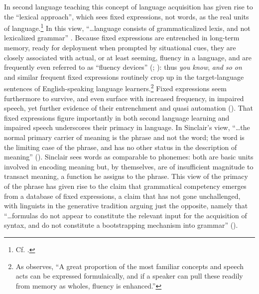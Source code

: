 \documentclass[output=paper]{langsci/langscibook}
\begin{document}
In second language teaching this concept of language acquisition has given rise to the ``lexical approach'', which sees fixed expressions, not words, as the real units of language.\footnote{Cf. \citealt{lewis_lexical_1993}.} In this view, “…language consists of grammaticalized lexis, and not lexicalized grammar” \citep[63]{mackenzie_institutionalized_2000}. Because fixed expressions are entrenched in long-term memory, ready for deployment when prompted by situational cues, they are closely associated with actual, or at least seeming, fluency in a language, and are frequently even referred to as ``fluency devices'' (\citealt[174]{mackenzie_improvisation_2000}; \citealt[3]{wood_formulaic_2002}): thus \textit{you know}, \textit{and so on} and similar frequent fixed expressions routinely crop up in the target-language sentences of English-speaking language learners.\footnote{As \citet[7]{wood_formulaic_2002} observes, “A great proportion of the most familiar concepts and speech acts can be expressed formulaically, and if a speaker can pull these readily from memory as wholes, fluency is enhanced.”} Fixed expressions seem furthermore to survive, and even surface with increased frequency, in impaired speech, yet further evidence of their entrenchment and quasi automation (\citealt[xxiv]{granger_phraseology:_2008}). That fixed expressions figure importantly in both second language learning and impaired speech underscores their primacy in language. In Sinclair’s view, “…the normal primary carrier of meaning is the phrase and not the word; the word is the limiting case of the phrase, and has no other status in the description of meaning” (\citeyear[409]{granger_phrase_2008}). Sinclair sees words as comparable to phonemes: both are basic units involved in encoding meaning but, by themselves, are of insufficient magnitude to transact meaning, a function he assigns to the phrase. This view of the primacy of the phrase has given rise to the claim that grammatical competency emerges from a database of fixed expressions, a claim that has not gone unchallenged, with linguists in the generative tradition arguing just the opposite, namely that “…formulas do not appear to constitute the relevant input for the acquisition of syntax, and do not constitute a bootstrapping mechanism into grammar” (\citealt[85]{bardovi-harlig_unconventional_2017}).
\end{document}
